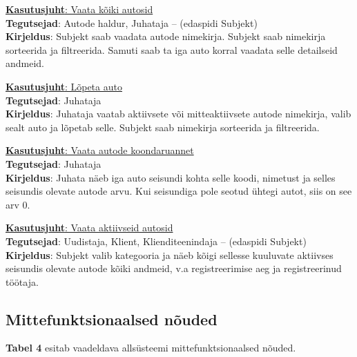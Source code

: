 \begin{flushleft}
	\underline{\textbf{Kasutusjuht}: Vaata kõiki autosid} \\
	\textbf{Tegutsejad}: Autode haldur, Juhataja – (edaspidi Subjekt) \\
	\textbf{Kirjeldus}: Subjekt saab vaadata autode nimekirja. Subjekt saab nimekirja sorteerida ja filtreerida. Samuti saab ta iga auto korral vaadata selle detailseid andmeid. 
\end{flushleft}

\begin{flushleft}
	\underline{\textbf{Kasutusjuht}: Lõpeta auto} \\
	\textbf{Tegutsejad}: Juhataja \\
	\textbf{Kirjeldus}: Juhataja vaatab aktiivsete või mitteaktiivsete autode nimekirja, valib sealt auto ja lõpetab selle. Subjekt saab nimekirja sorteerida ja filtreerida. 
\end{flushleft}

\begin{flushleft}
	\underline{\textbf{Kasutusjuht}: Vaata autode koondaruannet} \\
	\textbf{Tegutsejad}: Juhataja \\
	\textbf{Kirjeldus}: Juhata näeb iga auto seisundi kohta selle koodi, nimetust ja selles seisundis olevate autode arvu. Kui seisundiga pole seotud ühtegi autot, siis on see arv 0. 
\end{flushleft}

\begin{flushleft}
	\underline{\textbf{Kasutusjuht}: Vaata aktiivseid autosid} \\
	\textbf{Tegutsejad}: Uudistaja, Klient, Klienditeenindaja – (edaspidi Subjekt) \\
	\textbf{Kirjeldus}: Subjekt valib kategooria ja näeb kõigi sellesse kuuluvate aktiivses seisundis olevate autode kõiki andmeid, v.a registreerimise aeg ja registreerinud töötaja. 
\end{flushleft}


\subsection{Mittefunktsionaalsed nõuded}

\textbf{Tabel 4} esitab vaadeldava allsüsteemi mittefunktsionaalsed nõuded.

